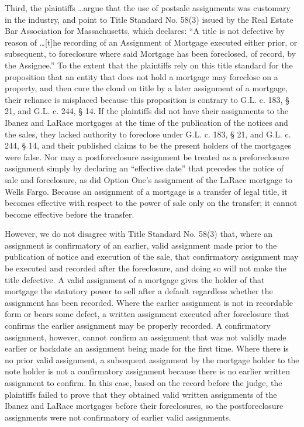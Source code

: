 Third, the plaintiffs \dots argue that the use of postsale assignments was
customary in the industry, and point to Title Standard No. 58(3) issued by the
Real Estate Bar Association for Massachusetts, which declares: ``A title is not
defective by reason of \dots [t]he recording of an Assignment of Mortgage
executed either prior, or subsequent, to foreclosure where said Mortgage has
been foreclosed, of record, by the Assignee.'' To the extent that the
plaintiffs rely on this title standard for the proposition that an entity that
does not hold a mortgage may foreclose on a property, and then cure the cloud
on title by a later assignment of a mortgage, their reliance is misplaced
because this proposition is contrary to G.L. c. 183, {\S} 21, and G.L. c. 244,
{\S} 14. If the plaintiffs did not have their assignments to the Ibanez and
LaRace mortgages at the time of the publication of the notices and the sales,
they lacked authority to foreclose under G.L. c. 183, {\S} 21, and G.L. c. 244,
{\S} 14, and their published claims to be the present holders of the mortgages
were false. Nor may a postforeclosure assignment be treated as a preforeclosure
assignment simply by declaring an ``effective date'' that precedes the notice
of sale and foreclosure, as did Option One's assignment of the LaRace mortgage
to Wells Fargo. Because an assignment of a mortgage is a transfer of legal
title, it becomes effective with respect to the power of sale only on the
transfer; it cannot become effective before the transfer. 

However, we do not disagree with Title Standard No. 58(3) that, where an
assignment is confirmatory of an earlier, valid assignment made prior to the
publication of notice and execution of the sale, that confirmatory assignment
may be executed and recorded after the foreclosure, and doing so will not make
the title defective. A valid assignment of a mortgage gives the holder of that
mortgage the statutory power to sell after a default regardless whether the
assignment has been recorded. Where the earlier assignment is not in recordable
form or bears some defect, a written assignment executed after foreclosure that
confirms the earlier assignment may be properly recorded. A confirmatory
assignment, however, cannot confirm an assignment that was not validly made
earlier or backdate an assignment being made for the first time. Where there is
no prior valid assignment, a subsequent assignment by the mortgage holder to
the note holder is not a confirmatory assignment because there is no earlier
written assignment to confirm. In this case, based on the record before the
judge, the plaintiffs failed to prove that they obtained valid written
assignments of the Ibanez and LaRace mortgages before their foreclosures, so
the postforeclosure assignments were not confirmatory of earlier valid
assignments.

